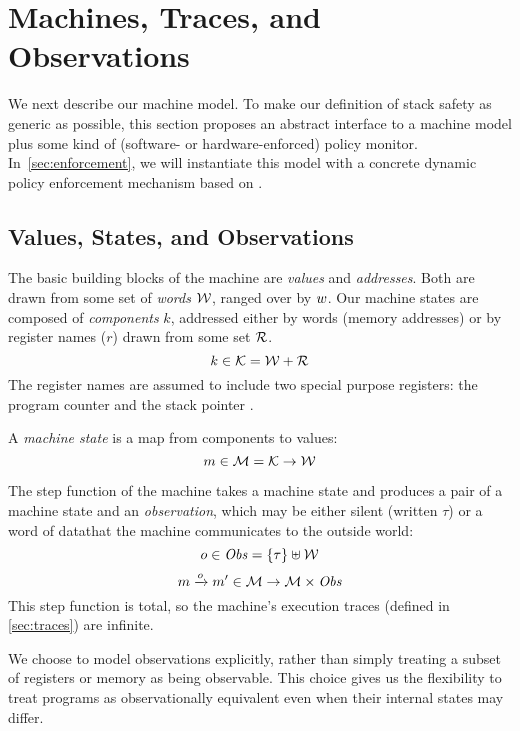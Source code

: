 \documentclass[acmsmall,review,anonymous]{acmart}\settopmatter{printfolios=true,printccs=false,printacmref=false}
\begin{document}


\section{Machines, Traces, and Observations}
\label{sec:prelim}

We next describe our machine model. To make our definition of stack safety
as generic as possible, this section proposes an abstract interface to a
machine model plus some kind of
(software- or
hardware-enforced) policy monitor. In~\cref{sec:enforcement}, we will
instantiate this model with a concrete dynamic policy enforcement mechanism
based on \citet{DBLP:conf/sp/RoesslerD18}.

\subsection{Values, States, and Observations}

The basic building blocks of the machine are {\em values} and {\em
  addresses}. Both are drawn from some set of {\em words}
${\mathcal W}$, ranged over by $w$.
%
Our machine states are composed of {\em components} $k$, addressed either by
words (memory addresses) or by register names ($r$) drawn from some set
${\mathcal R}$.
%
    \[k \in {\mathcal K} = {\mathcal W} + {\mathcal R} \]
%
The register names are assumed to include two special purpose registers: the
program counter {\PCname} and the stack pointer \SP.

A {\em machine state} is a map from components to values:
%
\[m \in {\mathcal M} = {\mathcal K} \rightarrow {\mathcal W}\]

The step function of the machine takes a machine state and produces a
pair of a machine state and an {\em observation}, which may be either
silent (written $\tau$) or a word of data\ifaftersubmission{}\fi that the machine
communicates to the outside world:
%
\[o \in \mathit{Obs} = \{\tau\} \uplus {\mathcal W}\]
\[m \xrightarrow{o} m' \in {\mathcal M} \rightarrow {\mathcal M} \times \mathit{Obs} \]
%
This step function is total, so the machine's execution traces
(defined in \cref{sec:traces}) are infinite.

We choose to model observations explicitly, rather than simply
treating
a subset of registers or memory as being observable.  This choice gives
us the flexibility to treat programs as observationally equivalent even when
their internal states may differ.
\end{document}
